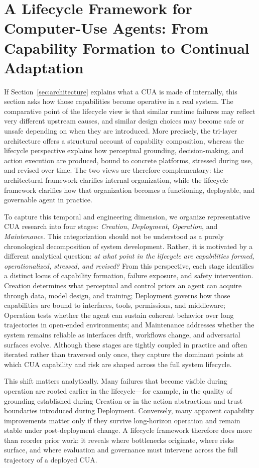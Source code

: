 \section{A Lifecycle Framework for Computer-Use Agents: From Capability Formation to Continual Adaptation}
\label{sec:lifecycle}

If Section~\ref{sec:architecture} explains what a CUA is made of internally, this section asks how those capabilities become operative in a real system. The comparative point of the lifecycle view is that similar runtime failures may reflect very different upstream causes, and similar design choices may become safe or unsafe depending on when they are introduced. More precisely, the tri-layer architecture offers a structural account of capability composition, whereas the lifecycle perspective explains how perceptual grounding, decision-making, and action execution are produced, bound to concrete platforms, stressed during use, and revised over time. The two views are therefore complementary: the architectural framework clarifies internal organization, while the lifecycle framework clarifies how that organization becomes a functioning, deployable, and governable agent in practice.

To capture this temporal and engineering dimension, we organize representative CUA research into four stages: \textit{Creation}, \textit{Deployment}, \textit{Operation}, and \textit{Maintenance}. This categorization should not be understood as a purely chronological decomposition of system development. Rather, it is motivated by a different analytical question: \emph{at what point in the lifecycle are capabilities formed, operationalized, stressed, and revised?} From this perspective, each stage identifies a distinct locus of capability formation, failure exposure, and safety intervention. Creation determines what perceptual and control priors an agent can acquire through data, model design, and training; Deployment governs how those capabilities are bound to interfaces, tools, permissions, and middleware; Operation tests whether the agent can sustain coherent behavior over long trajectories in open-ended environments; and Maintenance addresses whether the system remains reliable as interfaces drift, workflows change, and adversarial surfaces evolve. Although these stages are tightly coupled in practice and often iterated rather than traversed only once, they capture the dominant points at which CUA capability and risk are shaped across the full system lifecycle.

This shift matters analytically. Many failures that become visible during operation are rooted earlier in the lifecycle---for example, in the quality of grounding established during Creation or in the action abstractions and trust boundaries introduced during Deployment. Conversely, many apparent capability improvements matter only if they survive long-horizon operation and remain stable under post-deployment change. A lifecycle framework therefore does more than reorder prior work: it reveals where bottlenecks originate, where risks surface, and where evaluation and governance must intervene across the full trajectory of a deployed CUA.

